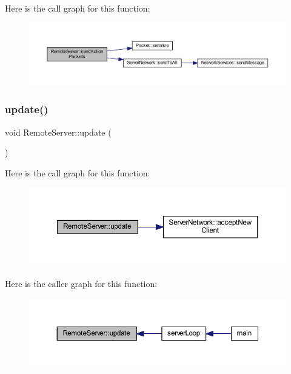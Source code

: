 Here is the call graph for this function\+:
\nopagebreak
\begin{figure}[H]
\begin{center}
\leavevmode
\includegraphics[width=350pt]{class_remote_server_a5469a07c01cff2b4f33962ad2e9d62e6_cgraph}
\end{center}
\end{figure}
\mbox{\label{class_remote_server_a3db7209565922096aa27128c011c476b}} 
\subsubsection{\texorpdfstring{update()}{update()}}
{\footnotesize\ttfamily void Remote\+Server\+::update (\begin{DoxyParamCaption}{ }\end{DoxyParamCaption})}

Here is the call graph for this function\+:
\nopagebreak
\begin{figure}[H]
\begin{center}
\leavevmode
\includegraphics[width=350pt]{class_remote_server_a3db7209565922096aa27128c011c476b_cgraph}
\end{center}
\end{figure}
Here is the caller graph for this function\+:
\nopagebreak
\begin{figure}[H]
\begin{center}
\leavevmode
\includegraphics[width=350pt]{class_remote_server_a3db7209565922096aa27128c011c476b_icgraph}
\end{center}
\end{figure}


